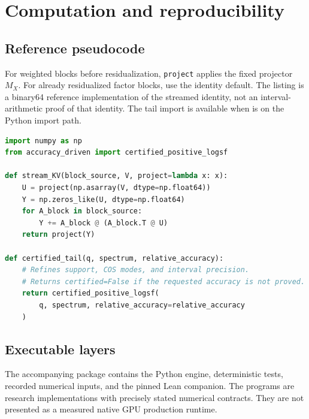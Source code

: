 \chapter{Computation and reproducibility}\label{app:reproduction}

\section{Reference pseudocode}\label{sec:final-A}

For weighted blocks before residualization, \texttt{project} applies the
fixed projector $M_X$. For already residualized factor blocks, use the
identity default. The listing is a binary64 reference implementation of the
streamed identity, not an interval-arithmetic proof of that identity. The
tail import is available when  is on the Python import path.

\begin{lstlisting}[language=Python]
import numpy as np
from accuracy_driven import certified_positive_logsf

def stream_KV(block_source, V, project=lambda x: x):
    U = project(np.asarray(V, dtype=np.float64))
    Y = np.zeros_like(U, dtype=np.float64)
    for A_block in block_source:
        Y += A_block @ (A_block.T @ U)
    return project(Y)

def certified_tail(q, spectrum, relative_accuracy):
    # Refines support, COS modes, and interval precision.
    # Returns certified=False if the requested accuracy is not proved.
    return certified_positive_logsf(
        q, spectrum, relative_accuracy=relative_accuracy
    )
\end{lstlisting}


\section{Executable layers}\label{sec:final-B}
The accompanying package contains the Python engine, deterministic tests,
recorded numerical inputs, and the pinned Lean companion. The programs are
research implementations with precisely stated numerical contracts. They are
not presented as a measured native GPU production runtime.

